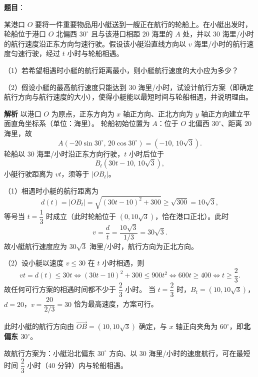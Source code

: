 \begin{answer}

\end{answer}
\begin{answer}

\textbf{题目}：

某港口 $O$ 要将一件重要物品用小艇送到一艘正在航行的轮船上。在小艇出发时，轮船位于港口 $O$ 北偏西 $30^\circ$ 且与该港口相距 $20$ 海里的 $A$ 处，并以 $30$ 海里/小时的航行速度沿正东方向匀速行驶。假设该小艇沿直线方向以 $v$ 海里/小时的航行速度匀速行驶，经过 $t$ 小时与轮船相遇。

（1）若希望相遇时小艇的航行距离最小，则小艇航行速度的大小应为多少？

（2）假设小艇的最高航行速度只能达到 $30$ 海里/小时，试设计航行方案（即确定航行方向与航行速度的大小），使得小艇能以最短时间与轮船相遇，并说明理由。

\textbf{解析}
以港口 $O$ 为原点，正东方向为 $x$ 轴正方向、正北方向为 $y$ 轴正方向建立平面直角坐标系（单位：海里）。
轮船初始位置为 $A$：位于 $O$ 北偏西 $30^\circ$、距离 $20$ 海里，故
\nopagebreak[4]
\[A\left(-20\sin30^\circ,\,20\cos30^\circ\right)=(-10,\,10\sqrt3).\]
轮船以 $30$ 海里/小时沿正东方向行驶，$t$ 小时后位于
\nopagebreak[4]
\[B_t\left(30t-10,\,10\sqrt3\right),\]
小艇行驶距离为 $vt$，须等于 $|OB_t|$。

（1）相遇时小艇的航行距离为
\nopagebreak[4]
\[d(t)=|OB_t|=\sqrt{(30t-10)^2+300}\geqslant\sqrt{300}=10\sqrt3,\]
等号当 $t=\dfrac13$ 时成立（此时轮船位于 $(0,10\sqrt3)$，恰在港口正北）。此时
\nopagebreak[4]
\[v=\frac{d}{t}=\frac{10\sqrt3}{1/3}=30\sqrt3.\]
故小艇航行速度应为 $30\sqrt3$ 海里/小时，航行方向为正北方向。

（2）设小艇以速度 $v\leqslant30$ 在 $t$ 小时相遇，则
\nopagebreak[4]
\[vt=d(t)\leqslant30t\iff(30t-10)^2+300\leqslant900t^2\iff600t\geqslant400\iff t\geqslant\frac23.\]
故任何可行方案的相遇时间都不少于 $\dfrac23$ 小时。
当 $t=\dfrac23$ 时，$B_t=(10,10\sqrt3)$，$d=20$，$v=\dfrac{20}{2/3}=30$ 恰为最高速度，方案可行。

此时小艇的航行方向由 $\overrightarrow{OB}=\left(10,10\sqrt3\right)$ 确定，与 $x$ 轴正向夹角为 $60^\circ$，即\textbf{北偏东 $30^\circ$}。

故航行方案为：小艇沿北偏东 $30^\circ$ 方向、以 $30$ 海里/小时的速度航行，可在最短时间 $\dfrac23$ 小时（$40$ 分钟）内与轮船相遇。


\end{answer}
